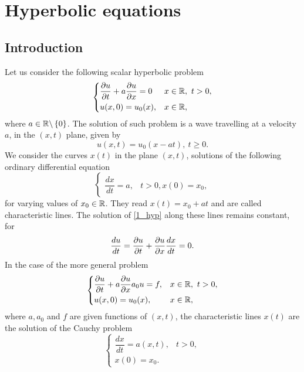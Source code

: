 \newpage
\section{Hyperbolic equations}
\subsection{Introduction}
Let us consider the following scalar hyperbolic problem 
\begin{equation}
    \begin{dcases}
        \partialderivative{u}{t} + a\partialderivative{u}{x} = 0 & x\in \real, \ t > 0, \\
        u(x, 0) = u_0 (x), & x\in \real, 
    \end{dcases}
    \label{1_hyp}
\end{equation}
where \(a \in \mathbb{R} \backslash \left\{ 0 \right\}\). The solution of such problem is a wave travelling at a velocity \(a\), in the \((x,t)\) plane, given by 
\[
    u(x,t) = u_0(x-at), \ t \geq 0.
\]
We consider the curves \(x(t)\) in the plane \((x,t)\), solutions of the following ordinary differential equation 
\begin{equation*}
    \begin{cases}
        \dfrac{dx}{dt} = a, & t>0,
        x(0) = x_0,
    \end{cases}
\end{equation*}
for varying values of \(x_0 \in \mathbb{R}\). They read \(x(t) = x_0 +at\) and are called characteristic lines. The solution of \eqref{1_hyp} along these lines remains constant, for 
\[
    \frac{du}{dt} = \partialderivative{u}{t} + \partialderivative{u}{x} \frac{dx}{dt} = 0.
\]
In the case of the more general problem
\begin{equation}
    \begin{dcases}
        \partialderivative{u}{t}+a\partialderivative{u}{x} a_0u = f, & x\in \real, \ t > 0, \\
        u(x, 0) = u_0(x), & x \in \real,
    \end{dcases}
    \label{2_hyp}
\end{equation}
where \(a,a_0\) and \(f\) are given functions of \((x,t)\), the characteristic lines \(x(t)\) are the solution of the Cauchy problem 
\begin{equation*}
    \begin{cases}
        \dfrac{dx}{dt} = a(x,t), & t>0, \\
        x(0) = x_0.
    \end{cases}
\end{equation*}
